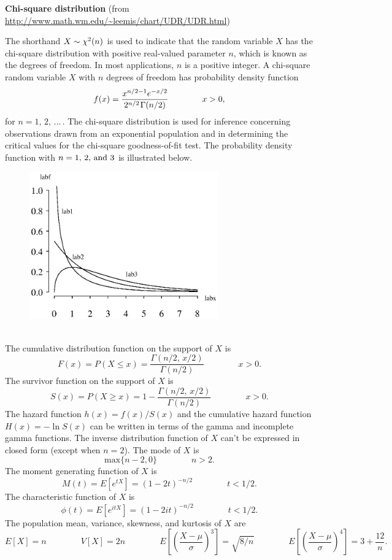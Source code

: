 \documentclass[12pt,fullpage]{article}
\begin{document}
\noindent
{\bf Chi-square distribution}
(from \color{blue}\url{http://www.math.wm.edu/~leemis/chart/UDR/UDR.html}\color{black})

\noindent
The shorthand $X \sim {\rm \chi^{2}}(n)$ is used to indicate that the
random variable $X$ has the chi-square distribution with positive
real-valued parameter $n$, which is known
as the degrees of freedom.
In most applications, $n$ is a positive integer.
A chi-square random variable $X$ with $n$ degrees of freedom has
probability density function 
$$
f(x) = \frac{x^{n/2-1}e^{-x/2}}{2^{n/2}\kern 0.08 em \Gamma(n/2)} \qquad \qquad x > 0,
$$
for $n = 1, \, 2, \,  \ldots \,$. 
The chi-square distribution is used for inference concerning
observations drawn from an exponential population and in
determining the critical values for the chi-square goodness-of-fit test.
The probability density function with $n=1,\, 2,\, {\rm and} \ 3$ is
illustrated below.
\begin{figure}[h!]
\begin{center}
\includegraphics[width=3.2in]{ChisquarePlot.ps}
\end{center}
\end{figure}\\
The cumulative distribution function on
the support of $X$ is
$$
F(x) = P(X \le x) = \frac{\Gamma(n/2, \, x/2)}{\Gamma(n/2)} \qquad \qquad x > 0.
$$
The survivor function on the support of $X$ is
$$
S(x) = P(X \ge x) = 1-\frac{\Gamma(n/2, \, x/2)}{\Gamma(n/2)} \qquad \qquad x > 0.
$$
The hazard function $h(x) = f(x) / S(x)$ and the cumulative hazard function 
$H(x) = - \ln S(x)$ can be written in terms of the gamma and incomplete
gamma functions.
The inverse distribution function of $X$ can't be expressed in closed form (except
when $n = 2$).
The mode of $X$ is
$$
\textrm{max}\{n-2,0\} \qquad \qquad n>2.
$$
The moment generating function of $X$ is
$$
M(t) = E\left[ e ^ {tX} \right] = (1-2t)^{-n/2} \qquad \qquad t < 1/2.
$$
The characteristic function of $X$ is
$$
\phi(t) = E\left[ e ^ {itX} \right] =  (1-2it)^{-n/2} \qquad \qquad t < 1/2.
$$
The population mean, variance, skewness, and kurtosis of $X$ are
$$
E[X] = n \qquad \qquad 
V[X] = 2n \qquad \qquad 
E\left[ \left( \frac{X - \mu}{\sigma} \right) ^ 3 \right] = \sqrt{8/n} \qquad \qquad 
E\left[ \left( \frac{X - \mu}{\sigma} \right) ^ 4 \right] = 3 + \frac{12}{n}.
$$
\end{document}
